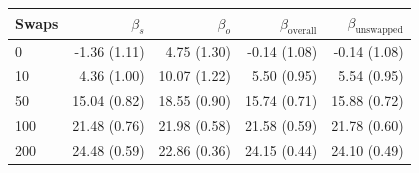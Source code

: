 \begin{table}[H]
\begin{tabular}{l rrrr}
\toprule
Swaps & $\beta_s$ & $\beta_o$ & $\beta_{\mathrm{overall}}$ & $\beta_{\mathrm{unswapped}}$ \\
\midrule
0 & -1.36 (1.11) & 4.75 (1.30) & -0.14 (1.08) & -0.14 (1.08) \\
10 & 4.36 (1.00) & 10.07 (1.22) & 5.50 (0.95) & 5.54 (0.95) \\
50 & 15.04 (0.82) & 18.55 (0.90) & 15.74 (0.71) & 15.88 (0.72) \\
100 & 21.48 (0.76) & 21.98 (0.58) & 21.58 (0.59) & 21.78 (0.60) \\
200 & 24.48 (0.59) & 22.86 (0.36) & 24.15 (0.44) & 24.10 (0.49) \\
\bottomrule
\end{tabular}
\end{table}

